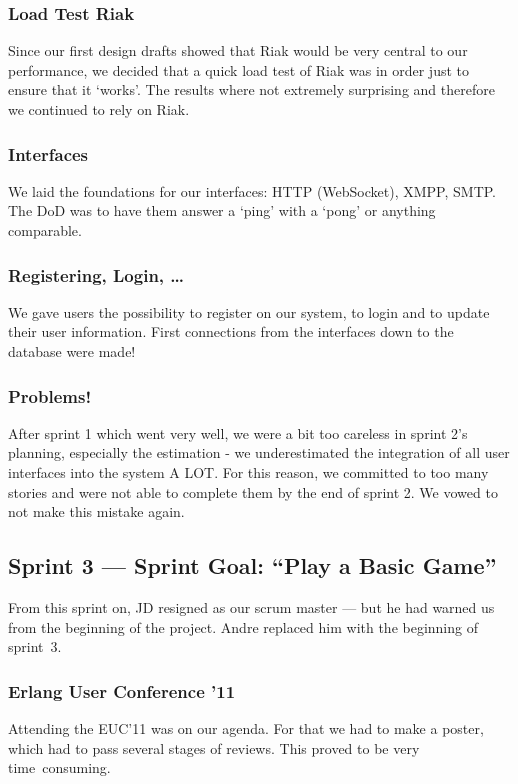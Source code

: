 \documentclass[11pt,a4paper]{report}
\begin{document}
\subsubsection{Load Test Riak}
Since our first design drafts showed that Riak would be very central to our
performance, we decided that a quick load test of Riak was in order just to
ensure that it `works'. The results where not extremely surprising and therefore
we continued to rely on Riak.

\subsubsection{Interfaces}
We laid the foundations for our interfaces: HTTP (WebSocket), XMPP, SMTP.
The DoD was to have them answer a `ping' with a `pong' or anything comparable.

\subsubsection{Registering, Login, \ldots}
We gave users the possibility to register on our system, to login and to update
their user information. First connections from the interfaces down to the
database were made!

\subsubsection{Problems!}
After sprint 1 which went very well, we were a bit too careless in sprint 2's
planning, especially the estimation - we underestimated the integration of
all user interfaces into the system A LOT.
For this reason, we committed to too many stories and were not able to complete
them by the end of sprint 2. We vowed to not make this mistake again.

\subsection*{Sprint 3 --- Sprint Goal: ``Play a Basic Game''}
From this sprint on, JD resigned as our scrum master --- but he had warned us
from the beginning of the project. Andre replaced him with the beginning of
sprint~3.

\subsubsection{Erlang User Conference '11}

Attending the EUC'11 was on our agenda. For that we had to make a
poster, which had to pass several stages of reviews. This proved to be very
time~consuming.
\end{document}
